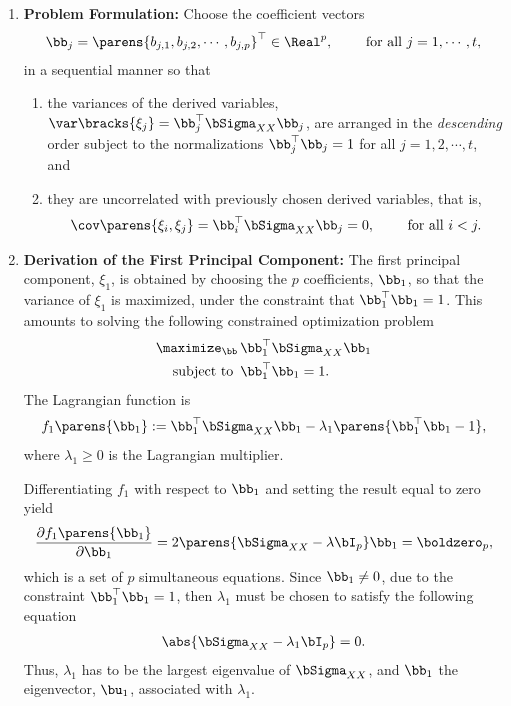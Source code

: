 \documentclass[12pt]{article}
\begin{document}
\begin{enumerate}[label=\textbf{\arabic*.}]

	\item \textbf{Problem Formulation:} Choose the coefficient vectors 
	\begin{align*}
		\bb_j = \parens{b_{j,1}, b_{j,2}, \cdots, b_{j,p}}^\top \in \Real^p, \qquad \text{ for all } j = 1, \cdots, t, 
	\end{align*}
	in a sequential manner so that 
	\begin{enumerate}
		\item the variances of the derived variables, $\var \bracks{\xi_j} = \bb_j^{\top} \bSigma_{XX} \bb_j$, are arranged in the \emph{descending} order subject to the normalizations $\bb_j^\top \bb_j = 1$ for all $j = 1, 2, \cdots, t$, and 
		\item they are uncorrelated with previously chosen derived variables, that is,  
		\begin{align*}
			\cov \parens{\xi_i, \xi_j} = \bb_i^\top \bSigma_{XX} \bb_j = 0, \qquad \text{ for all } i < j. 
		\end{align*}
	\end{enumerate}
	
	\item \textbf{Derivation of the First Principal Component:} The first principal component, $\xi_1$, is obtained by choosing the $p$ coefficients, $\bb_1$, so that the variance of $\xi_1$ is maximized, under the constraint that $\bb_1^\top \bb_1 = 1$. This amounts to solving the following constrained optimization problem
	\begin{equation*}
		\begin{aligned}
			\maximize_{\bb} & \, \bb_1^\top \bSigma_{XX} \bb_1 \\ 
			\text{ subject to } & \, \bb_1^\top \bb_1 = 1. 
		\end{aligned}
	\end{equation*}
	The Lagrangian function is 
	\begin{align}\label{eq-pc1-lag}
		f_1 \parens{\bb_1} := \bb_1^\top \bSigma_{XX} \bb_1 - \lambda_1 \parens{\bb_1^\top \bb_1 - 1}, 
	\end{align}
	where $\lambda_1 \ge 0$ is the Lagrangian multiplier. 
	
	Differentiating $f_1$ with respect to $\bb_1$ and setting the result equal to zero yield 
	\begin{align}\label{eq-pc1-lag1}
		\frac{\partial f_1 \parens{\bb_1}}{\partial \bb_1} = 2 \parens{\bSigma_{XX} - \lambda \bI_p} \bb_1 = \boldzero_p, 
	\end{align}
	which is a set of $p$ simultaneous equations. Since $\bb_1 \neq 0$, due to the constraint $\bb_1^\top \bb_1 = 1$, then $\lambda_1$ must be chosen to satisfy the following equation
	\begin{align*}
		\abs{\bSigma_{XX} - \lambda_1 \bI_p} = 0. 
	\end{align*}
	Thus, $\lambda_1$ has to be the largest eigenvalue of $\bSigma_{XX}$, and $\bb_1$ the eigenvector, $\bu_1$, associated with $\lambda_1$. 
	

\end{enumerate}
\end{document}

